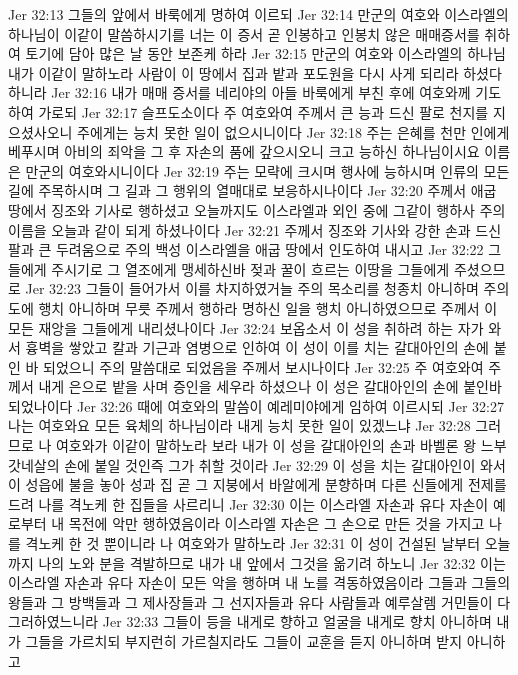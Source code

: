 Jer 32:13  그들의 앞에서 바룩에게 명하여 이르되
Jer 32:14  만군의 여호와 이스라엘의 하나님이 이같이 말씀하시기를 너는 이 증서 곧 인봉하고 인봉치 않은 매매증서를 취하여 토기에 담아 많은 날 동안 보존케 하라
Jer 32:15  만군의 여호와 이스라엘의 하나님 내가 이같이 말하노라 사람이 이 땅에서 집과 밭과 포도원을 다시 사게 되리라 하셨다 하니라
Jer 32:16  내가 매매 증서를 네리야의 아들 바룩에게 부친 후에 여호와께 기도하여 가로되
Jer 32:17  슬프도소이다 주 여호와여 주께서 큰 능과 드신 팔로 천지를 지으셨사오니 주에게는 능치 못한 일이 없으시니이다
Jer 32:18  주는 은혜를 천만 인에게 베푸시며 아비의 죄악을 그 후 자손의 품에 갚으시오니 크고 능하신 하나님이시요 이름은 만군의 여호와시니이다
Jer 32:19  주는 모략에 크시며 행사에 능하시며 인류의 모든 길에 주목하시며 그 길과 그 행위의 열매대로 보응하시나이다
Jer 32:20  주께서 애굽 땅에서 징조와 기사로 행하셨고 오늘까지도 이스라엘과 외인 중에 그같이 행하사 주의 이름을 오늘과 같이 되게 하셨나이다
Jer 32:21  주께서 징조와 기사와 강한 손과 드신 팔과 큰 두려움으로 주의 백성 이스라엘을 애굽 땅에서 인도하여 내시고
Jer 32:22  그들에게 주시기로 그 열조에게 맹세하신바 젖과 꿀이 흐르는 이땅을 그들에게 주셨으므로
Jer 32:23  그들이 들어가서 이를 차지하였거늘 주의 목소리를 청종치 아니하며 주의 도에 행치 아니하며 무릇 주께서 행하라 명하신 일을 행치 아니하였으므로 주께서 이 모든 재앙을 그들에게 내리셨나이다
Jer 32:24  보옵소서 이 성을 취하려 하는 자가 와서 흉벽을 쌓았고 칼과 기근과 염병으로 인하여 이 성이 이를 치는 갈대아인의 손에 붙인 바 되었으니 주의 말씀대로 되었음을 주께서 보시나이다
Jer 32:25  주 여호와여 주께서 내게 은으로 밭을 사며 증인을 세우라 하셨으나 이 성은 갈대아인의 손에 붙인바 되었나이다
Jer 32:26  때에 여호와의 말씀이 예레미야에게 임하여 이르시되
Jer 32:27  나는 여호와요 모든 육체의 하나님이라 내게 능치 못한 일이 있겠느냐
Jer 32:28  그러므로 나 여호와가 이같이 말하노라 보라 내가 이 성을 갈대아인의 손과 바벨론 왕 느부갓네살의 손에 붙일 것인즉 그가 취할 것이라
Jer 32:29  이 성을 치는 갈대아인이 와서 이 성읍에 불을 놓아 성과 집 곧 그 지붕에서 바알에게 분향하며 다른 신들에게 전제를 드려 나를 격노케 한 집들을 사르리니
Jer 32:30  이는 이스라엘 자손과 유다 자손이 예로부터 내 목전에 악만 행하였음이라 이스라엘 자손은 그 손으로 만든 것을 가지고 나를 격노케 한 것 뿐이니라 나 여호와가 말하노라
Jer 32:31  이 성이 건설된 날부터 오늘까지 나의 노와 분을 격발하므로 내가 내 앞에서 그것을 옮기려 하노니
Jer 32:32  이는 이스라엘 자손과 유다 자손이 모든 악을 행하며 내 노를 격동하였음이라 그들과 그들의 왕들과 그 방백들과 그 제사장들과 그 선지자들과 유다 사람들과 예루살렘 거민들이 다 그러하였느니라
Jer 32:33  그들이 등을 내게로 향하고 얼굴을 내게로 향치 아니하며 내가 그들을 가르치되 부지런히 가르칠지라도 그들이 교훈을 듣지 아니하며 받지 아니하고
